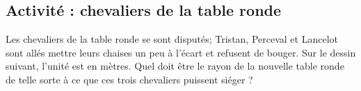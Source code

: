 
\subsection*{Activité : chevaliers de la table ronde}

Les chevaliers de la table ronde se sont disputés; Tristan, Perceval et Lancelot sont allés mettre leurs chaises un peu à l'écart et refusent de bouger. Sur le dessin suivant, l'unité est en mètres. Quel doit être le rayon de la nouvelle table ronde de telle sorte à ce que ces trois chevaliers puissent siéger ?

\begin{center}
   
\end{center}
